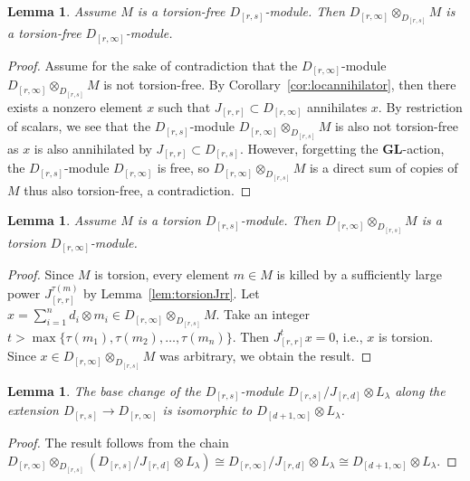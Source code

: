 \documentclass[12pt]{amsart}
\newcommand{\Drs}{D_{[r,s]}}
\newcommand{\Jrd}{J_{[r,d]}}
\newcommand{\Jrr}{J_{[r,r]}}
\newcommand{\Drinfty}{D_{[r,\infty]}}
\newcommand{\GL}{\mathbf{GL}}
\numberwithin{equation}{section}
\newtheorem{lemma}[equation]{Lemma}
\theoremstyle{definition}
\theoremstyle{plain}
\begin{document}
\begin{lemma} \label{lem:tfext}
Assume $M$ is a torsion-free $\Drs$-module. Then $\Drinfty \otimes_{\Drs} M$ is a torsion-free $\Drinfty$-module.
\end{lemma}
\begin{proof}
   Assume for the sake of contradiction that the $\Drinfty$-module $\Drinfty \otimes_{\Drs} M$ is not torsion-free. By Corollary~\ref{cor:locannihilator}, then there exists a nonzero element $x$ such that $\Jrr \subset \Drinfty$ annihilates $x$. By restriction of scalars, we see that the $\Drs$-module $\Drinfty \otimes_{\Drs} M$ is also not torsion-free as $x$ is also annihilated by $\Jrr \subset \Drs$. However, forgetting the $\GL$-action, the $\Drs$-module $\Drinfty$ is free, so $\Drinfty \otimes_{\Drs} M$ is a direct sum of copies of $M$ thus also torsion-free, a contradiction.
\end{proof}
\begin{lemma} \label{lem:torsext}
Assume $M$ is a torsion $\Drs$-module. Then $\Drinfty \otimes_{\Drs} M$ is a torsion $\Drinfty$-module.
\end{lemma}
\begin{proof}
Since $M$ is torsion, every element $m \in M$ is killed by a sufficiently large power $\Jrr^{\tau(m)}$ by Lemma~\ref{lem:torsionJrr}. Let $x = \sum_{i=1}^n d_i \otimes m_i \in \Drinfty \otimes_{\Drs} M$. Take an integer $t > \max\{\tau(m_1), \tau(m_2), \ldots, \tau(m_n)\}$. Then $\Jrr^t x = 0$, i.e., $x$ is torsion. Since $x \in 
\Drinfty \otimes_{\Drs} M$ was arbitrary, we obtain the result.
\end{proof}
\begin{lemma}\label{lem:extension}
 The base change of the $\Drs$-module $\Drs/\Jrd \otimes L_{\lambda}$ along the extension $\Drs \to \Drinfty$ is isomorphic to $D_{[d+1, \infty]} \otimes L_{\lambda}$. 
\end{lemma}
\begin{proof}
   The result follows from the chain $ \Drinfty \otimes_{\Drs} (\Drs/\Jrd \otimes L_{\lambda}) \cong \Drinfty/\Jrd \otimes L_{\lambda} \cong D_{[d+1, \infty]} \otimes L_{\lambda}$.
\end{proof}
\end{document}
